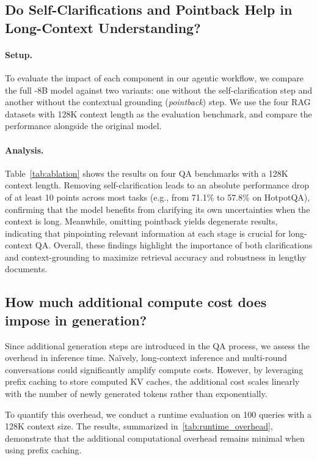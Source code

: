
\subsection{Do Self-Clarifications and Pointback Help in Long-Context Understanding?}
\paragraph{Setup.}
To evaluate the impact of each component in our agentic workflow, we compare the full \method-8B model against two variants: one without the self-clarification step and another without the contextual grounding (\emph{pointback}) step. 
We use the four RAG datasets with 128K context length as the evaluation benchmark, and compare the performance alongside the original model.

\paragraph{Analysis.}
Table~\ref{tab:ablation} shows the results on four QA benchmarks with a 128K context length. Removing self-clarification leads to an absolute performance drop of at least 10 points across most tasks (e.g., from 71.1\% to 57.8\% on HotpotQA), confirming that the model benefits from clarifying its own uncertainties when the context is long. Meanwhile, omitting pointback yields degenerate results, indicating that pinpointing relevant information at each stage is crucial for long-context QA. Overall, these findings highlight the importance of both clarifications and context-grounding to maximize retrieval accuracy and robustness in lengthy documents.

\subsection{How much additional compute cost does \method impose in generation?}
Since additional generation steps are introduced in the QA process, we assess the overhead in inference time.
Naïvely, long-context inference and multi-round conversations could significantly amplify compute costs. However, by leveraging prefix caching to store computed KV caches, the additional cost scales linearly with the number of newly generated tokens rather than exponentially.

To quantify this overhead, we conduct a runtime evaluation on 100 queries with a 128K context size. The results, summarized in~\cref{tab:runtime_overhead}, demonstrate that the additional computational overhead remains minimal when using prefix caching.

